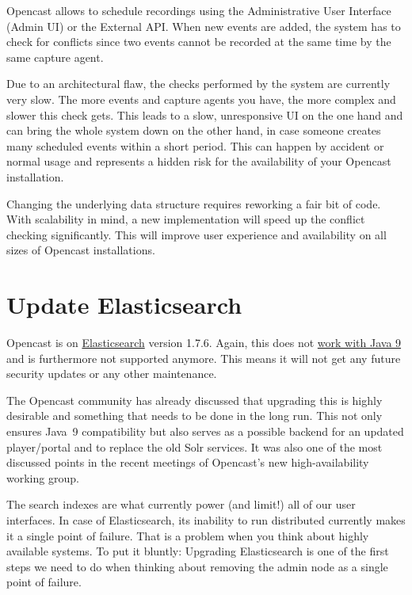 \documentclass[a4paper]{article}
\begin{document}
Opencast allows to schedule recordings using the Administrative User Interface
(Admin UI) or the External API. When new events are added, the system has to
check for conflicts since two events cannot be recorded at the same time by the
same capture agent.

Due to an architectural flaw, the checks performed by the system are
currently very slow. The more events and capture agents you have, the
more complex and slower this check gets. This leads to a slow,
unresponsive UI on the one hand and can bring the whole system down on
the other hand, in case someone creates many scheduled events within a
short period. This can happen by accident or normal usage and
represents a hidden risk for the availability of your Opencast
installation.

Changing the underlying data structure requires reworking a fair bit of
code. With scalability in mind, a new implementation will speed up the
conflict checking significantly. This will improve user experience and
availability on all sizes of Opencast installations.


\section*{Update Elasticsearch}

Opencast is on
\href{https://www.elastic.co/products/elasticsearch}{Elasticsearch} version
1.7.6. Again, this does not
\href{https://www.elastic.co/support/matrix#matrix_jvm}{work with Java 9} and
is furthermore not supported anymore. This means it will not get any future
security updates or any other maintenance.

The Opencast community has already discussed that upgrading
this is highly desirable and something that needs to be done in the
long run. This not only ensures Java~9 compatibility but also serves as a
possible backend for an updated player/portal and to replace the old Solr
services. It was also one of the most discussed points in the recent
meetings of Opencast's new high-availability working group.

The search indexes are what currently power (and limit!) all of our
user interfaces. In case of Elasticsearch, its inability to run
distributed currently makes it a single point of failure. That is a
problem when you think about highly available systems. To put it
bluntly: Upgrading Elasticsearch is one of the first steps we need to
do when thinking about removing the admin node as a single point of
failure.
\end{document}
